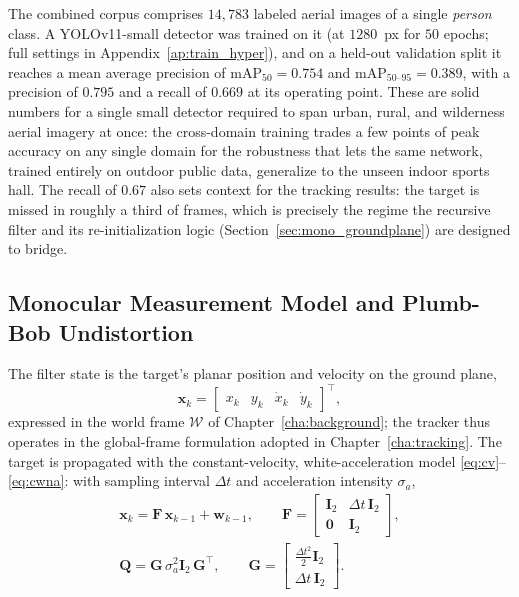The combined corpus comprises $14{,}783$ labeled aerial images of a single
\emph{person} class. A YOLOv11-small detector was trained on it
(at $1280$~px for $50$ epochs; full settings in Appendix~\ref{ap:train_hyper}),
and on a held-out validation split it reaches a mean average precision of
$\mathrm{mAP}_{50}=0.754$ and $\mathrm{mAP}_{50\text{--}95}=0.389$, with a
precision of $0.795$ and a recall of $0.669$ at its operating point. These are
solid numbers for a single small detector required to span urban, rural, and
wilderness aerial imagery at once: the cross-domain training trades a few points
of peak accuracy on any single domain for the robustness that lets the same
network, trained entirely on outdoor public data, generalize to the unseen indoor
sports hall. The recall of $0.67$ also sets context for the tracking results: the
target is missed in roughly a third of frames, which is precisely the regime the
recursive filter and its re-initialization logic (Section~\ref{sec:mono_groundplane})
are designed to bridge.

\subsection{Monocular Measurement Model and Plumb-Bob Undistortion}
\label{sec:mono_meas}

The filter state is the target's planar position and velocity on the ground
plane,
\begin{equation}
  \bm{x}_k = \begin{bmatrix} x_k & y_k & \dot{x}_k & \dot{y}_k \end{bmatrix}^{\!\top},
  \label{eq:mono_state}
\end{equation}
expressed in the world frame $\mathcal{W}$ of Chapter~\ref{cha:background}; the
tracker thus operates in the global-frame formulation adopted in
Chapter~\ref{cha:tracking}. The target is propagated with the constant-velocity,
white-acceleration model \eqref{eq:cv}--\eqref{eq:cwna}: with sampling interval
$\Delta t$ and acceleration intensity $\sigma_a$,
\begin{equation}
  \begin{gathered}
  \bm{x}_{k} = \bm{F}\,\bm{x}_{k-1} + \bm{w}_{k-1},\qquad
  \bm{F} = \begin{bmatrix} \bm{I}_2 & \Delta t\,\bm{I}_2 \\ \bm{0} & \bm{I}_2 \end{bmatrix},\\[4pt]
  \bm{Q} = \bm{G}\,\sigma_a^2\bm{I}_2\,\bm{G}^{\!\top},\qquad
  \bm{G} = \begin{bmatrix} \tfrac{\Delta t^2}{2}\bm{I}_2 \\ \Delta t\,\bm{I}_2 \end{bmatrix}.
  \end{gathered}
  \label{eq:mono_process}
\end{equation}

